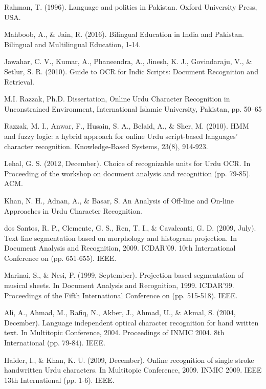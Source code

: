 \begin{thebibliography}{130}

Rahman, T. (1996). Language and politics in Pakistan. Oxford University Press, USA.

Mahboob, A., \& Jain, R. (2016). Bilingual Education in India and Pakistan. Bilingual and Multilingual Education, 1-14.

Jawahar, C. V., Kumar, A., Phaneendra, A., Jinesh, K. J., Govindaraju, V., \& Setlur, S. R. (2010). Guide to OCR for Indic Scripts: Document Recognition and Retrieval.

M.I. Razzak, Ph.D. Dissertation, Online Urdu Character Recognition in Unconstrained Environment, International Islamic University, Pakistan, pp. 50–65

Razzak, M. I., Anwar, F., Husain, S. A., Belaid, A., \& Sher, M. (2010). HMM and fuzzy logic: a hybrid approach for online Urdu script-based languages’ character recognition. Knowledge-Based Systems, 23(8), 914-923. 

Lehal, G. S. (2012, December). Choice of recognizable units for Urdu OCR. In Proceeding of the workshop on document analysis and recognition (pp. 79-85). ACM.

Khan, N. H., Adnan, A., \& Basar, S. An Analysis of Off-line and On-line Approaches in Urdu Character Recognition.

dos Santos, R. P., Clemente, G. S., Ren, T. I., \& Cavalcanti, G. D. (2009, July). Text line segmentation based on morphology and histogram projection. In Document Analysis and Recognition, 2009. ICDAR'09. 10th International Conference on (pp. 651-655). IEEE.

Marinai, S., \& Nesi, P. (1999, September). Projection based segmentation of musical sheets. In Document Analysis and Recognition, 1999. ICDAR'99. Proceedings of the Fifth International Conference on (pp. 515-518). IEEE.

Ali, A., Ahmad, M., Rafiq, N., Akber, J., Ahmad, U., \& Akmal, S. (2004, December). Language independent optical character recognition for hand written text. In Multitopic Conference, 2004. Proceedings of INMIC 2004. 8th International (pp. 79-84). IEEE.

Haider, I., \& Khan, K. U. (2009, December). Online recognition of single stroke handwritten Urdu characters. In Multitopic Conference, 2009. INMIC 2009. IEEE 13th International (pp. 1-6). IEEE.


\end{thebibliography}

